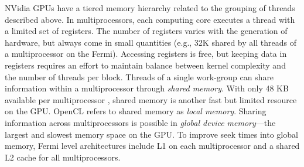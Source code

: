 
NVidia GPUs have a tiered memory hierarchy related to the grouping of threads described above. 
In multiprocessors, each computing core executes a thread with a limited set of registers. The number of registers varies with the generation of hardware, but always come in small quantities (e.g., 32K shared by all threads of a multiprocessor on the Fermi). Accessing registers is free, but keeping data in registers requires an effort to maintain balance between kernel complexity and the number of threads per block. Threads of a single work-group can share information within a multiprocessor through \textit{shared memory}. With only 48 KB 
available per 
multiprocessor \cite{CudaGuide2011}, shared memory is another fast but limited resource on the GPU. OpenCL refers to shared memory as \textit{local memory}. 
Sharing information across multiprocessors is possible in \textit{global device memory}---the largest and slowest memory space on the GPU. To improve seek times into global memory, Fermi level architectures include L1 on each multiprocessor and a shared L2 cache for all multiprocessors.




%


